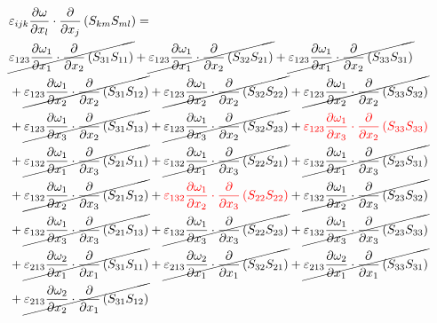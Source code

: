 \begin{equation}
	\begin{split}
		 & \varepsilon_{ijk}\pdv{\omega}{x_{l}} \cdot\pdv{}{x_{j}}\left(S_{km}S_{ml}\right) =  \\ 
		&\cancel{\varepsilon_{123}\pdv{\omega_{1}}{x_{1}}\cdot\pdv{}{x_{2}}\left(S_{31}S_{11}\right)
}		+\cancel{\varepsilon_{123}\pdv{\omega_{1}}{x_{1}}\cdot\pdv{}{x_{2}}\left(S_{32}S_{21}\right)
}		+\cancel{\varepsilon_{123}\pdv{\omega_{1}}{x_{1}}\cdot\pdv{}{x_{2}}\left(S_{33}S_{31}\right)
}\\ 
		&+\cancel{\varepsilon_{123}\pdv{\omega_{1}}{x_{2}}\cdot\pdv{}{x_{2}}\left(S_{31}S_{12}\right)
}		+\cancel{\varepsilon_{123}\pdv{\omega_{1}}{x_{2}}\cdot\pdv{}{x_{2}}\left(S_{32}S_{22}\right)
}		+\cancel{\varepsilon_{123}\pdv{\omega_{1}}{x_{2}}\cdot\pdv{}{x_{2}}\left(S_{33}S_{32}\right)
}\\ 
		&+\cancel{\varepsilon_{123}\pdv{\omega_{1}}{x_{3}}\cdot\pdv{}{x_{2}}\left(S_{31}S_{13}\right)
}		+\cancel{\varepsilon_{123}\pdv{\omega_{1}}{x_{3}}\cdot\pdv{}{x_{2}}\left(S_{32}S_{23}\right)
}		+{\color{red}\varepsilon_{123}\pdv{\omega_{1}}{x_{3}}\cdot\pdv{}{x_{2}}\left(S_{33}S_{33}\right)
}\\ 
		&+\cancel{\varepsilon_{132}\pdv{\omega_{1}}{x_{1}}\cdot\pdv{}{x_{3}}\left(S_{21}S_{11}\right)
}		+\cancel{\varepsilon_{132}\pdv{\omega_{1}}{x_{1}}\cdot\pdv{}{x_{3}}\left(S_{22}S_{21}\right)
}		+\cancel{\varepsilon_{132}\pdv{\omega_{1}}{x_{1}}\cdot\pdv{}{x_{3}}\left(S_{23}S_{31}\right)
}\\ 
		&+\cancel{\varepsilon_{132}\pdv{\omega_{1}}{x_{2}}\cdot\pdv{}{x_{3}}\left(S_{21}S_{12}\right)
}		+{\color{red}\varepsilon_{132}\pdv{\omega_{1}}{x_{2}}\cdot\pdv{}{x_{3}}\left(S_{22}S_{22}\right)
}		+\cancel{\varepsilon_{132}\pdv{\omega_{1}}{x_{2}}\cdot\pdv{}{x_{3}}\left(S_{23}S_{32}\right)
}\\ 
		&+\cancel{\varepsilon_{132}\pdv{\omega_{1}}{x_{3}}\cdot\pdv{}{x_{3}}\left(S_{21}S_{13}\right)
}		+\cancel{\varepsilon_{132}\pdv{\omega_{1}}{x_{3}}\cdot\pdv{}{x_{3}}\left(S_{22}S_{23}\right)
}		+\cancel{\varepsilon_{132}\pdv{\omega_{1}}{x_{3}}\cdot\pdv{}{x_{3}}\left(S_{23}S_{33}\right)
}\\ 
		&+\cancel{\varepsilon_{213}\pdv{\omega_{2}}{x_{1}}\cdot\pdv{}{x_{1}}\left(S_{31}S_{11}\right)
}		+\cancel{\varepsilon_{213}\pdv{\omega_{2}}{x_{1}}\cdot\pdv{}{x_{1}}\left(S_{32}S_{21}\right)
}		+\cancel{\varepsilon_{213}\pdv{\omega_{2}}{x_{1}}\cdot\pdv{}{x_{1}}\left(S_{33}S_{31}\right)
}\\ 
		&+\cancel{\varepsilon_{213}\pdv{\omega_{2}}{x_{2}}\cdot\pdv{}{x_{1}}\left(S_{31}S_{12}\right)
}
\end{split}
\end{equation}
